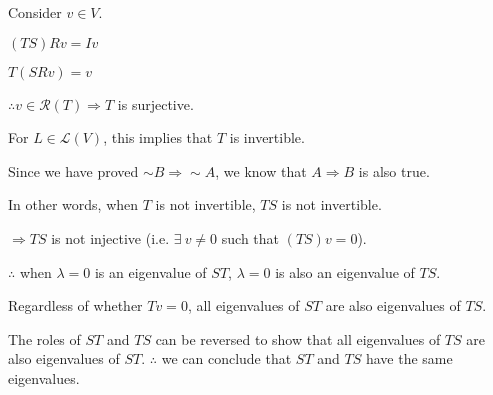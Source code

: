 \documentclass[fleqn]{article}
\begin{document}
\begin{enumerate}[nolistsep]
			Consider $v \in V$.
			
			$(TS)Rv = Iv$
			
			$T(SRv) = v$
			
			$\therefore v \in \mathcal{R}(T) \Rightarrow T$ is surjective.
			
			For $L \in \mathcal{L}(V)$, this implies that $T$ is invertible.
			
			Since we have proved ${\sim}B \Rightarrow {\sim}A$, we know that $A \Rightarrow B$ is also true.
			
			In other words, when $T$ is not invertible, $TS$ is not invertible.
			
			$\Rightarrow TS$ is not injective (i.e. $\exists\ v \neq 0$ such that $(TS)v = 0$).
			
			$\therefore$ when $\lambda = 0$ is an eigenvalue of $ST$, $\lambda = 0$ is also an eigenvalue of $TS$.
			
			Regardless of whether $Tv = 0$, all eigenvalues of $ST$ are also eigenvalues of $TS$. 
			
			The roles of $ST$ and $TS$ can be reversed to show that all eigenvalues of $TS$ are also eigenvalues of $ST$. $\therefore$ we can conclude that $ST$ and $TS$ have the same eigenvalues.
			
		\end{enumerate}	
\end{document}
